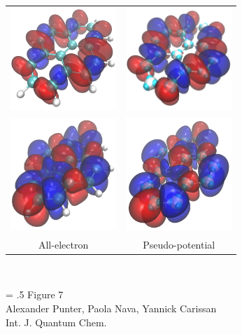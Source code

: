 \documentclass[12pt]{article}
\begin{document}
\begin{figure}
\begin{center}
\begin{tabular}{|c|c|}
\hline
\includegraphics[width=4cm]{pyrene_peak1_ref_white} &
\includegraphics[width=4cm]{pyrene_peak1_ps_white} \\
\includegraphics[width=4cm]{pyrene_peak2_ref_white} &
\includegraphics[width=4cm]{pyrene_peak2_ps_white} \\
\hline
All-electron & Pseudo-potential\\
\hline
\end{tabular}\\
\end{center}
\vspace{0.25in}
{\Large
\begin{minipage}[t]{3in}
\baselineskip = .5\baselineskip
Figure 7 \\
Alexander Punter, Paola Nava, Yannick Carissan\\
Int. J. Quantum Chem.
\end{minipage}
}
\end{figure}
\end{document}
